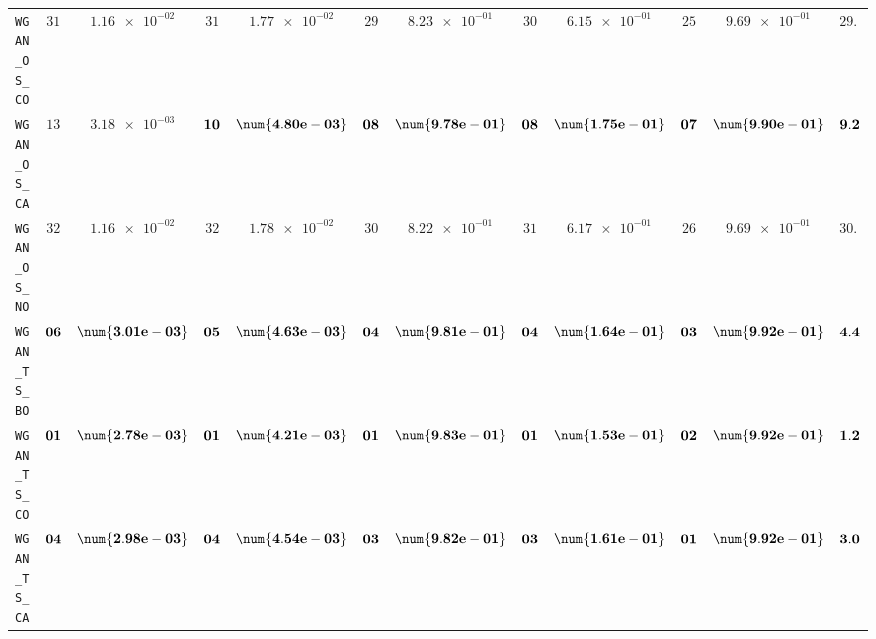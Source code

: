 \begin{table}[H]
\begin{tabularx}{\textwidth}{l||cC|cC|cC|cC|cC||c}
		\texttt{WGAN\_OS\_CO} & $ 31$ & $ \num{1.16e-02}$ & $ 31$ & $ \num{1.77e-02}$ & $ 29$ & $ \num{8.23e-01}$ & $ 30$ & $ \num{6.15e-01}$ & $ 25$ & $ \num{9.69e-01}$ & $ 29.2$  \\
		\texttt{WGAN\_OS\_CA} & $ 13$ & $ \num{3.18e-03}$ & $\bf 10$ & $\bf \num{4.80e-03}$ & $\bf 08$ & $\bf \num{9.78e-01}$ & $\bf 08$ & $\bf \num{1.75e-01}$ & $\bf 07$ & $\bf \num{9.90e-01}$ & $\bf 9.2$  \\
		\texttt{WGAN\_OS\_NO} & $ 32$ & $ \num{1.16e-02}$ & $ 32$ & $ \num{1.78e-02}$ & $ 30$ & $ \num{8.22e-01}$ & $ 31$ & $ \num{6.17e-01}$ & $ 26$ & $ \num{9.69e-01}$ & $ 30.2$  \\
		\texttt{WGAN\_TS\_BO} & $\bf 06$ & $\bf \num{3.01e-03}$ & $\bf 05$ & $\bf \num{4.63e-03}$ & $\bf 04$ & $\bf \num{9.81e-01}$ & $\bf 04$ & $\bf \num{1.64e-01}$ & $\bf 03$ & $\bf \num{9.92e-01}$ & $\bf 4.4$  \\
		\texttt{WGAN\_TS\_CO} & $\bf 01$ & $\bf \num{2.78e-03}$ & $\bf 01$ & $\bf \num{4.21e-03}$ & $\bf 01$ & $\bf \num{9.83e-01}$ & $\bf 01$ & $\bf \num{1.53e-01}$ & $\bf 02$ & $\bf \num{9.92e-01}$ & $\bf 1.2$  \\
		\texttt{WGAN\_TS\_CA} & $\bf 04$ & $\bf \num{2.98e-03}$ & $\bf 04$ & $\bf \num{4.54e-03}$ & $\bf 03$ & $\bf \num{9.82e-01}$ & $\bf 03$ & $\bf \num{1.61e-01}$ & $\bf 01$ & $\bf \num{9.92e-01}$ & $\bf 3.0$  \\

\end{tabularx}
\end{table}
